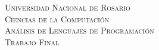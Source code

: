\documentclass[12pt]{article}
\begin{document}
\begin{titlepage}

\newcommand{\HRule}{\rule{\linewidth}{0.5mm}} %

\center %
 

\textsc{\LARGE Universidad Nacional de Rosario}\\[0.5cm] %
\textsc{\Large Ciencias de la Computación}\\[1.5cm] %
\textsc{\Large Análisis de Lenguajes de Programación}\\[0.5cm] %
\textsc{\large Trabajo Final}\\[0.5cm] %



\end{titlepage}
\end{document}
